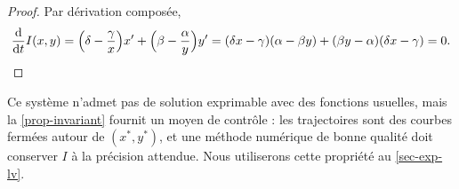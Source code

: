 
\begin{proof}
Par dérivation composée,
\[
  \frac{\mathrm{d}}{\mathrm{d} t}I(x,y)=\Bigl(\delta-\frac{\gamma}{x}\Bigr)x'+\Bigl(\beta-\frac{\alpha}{y}\Bigr)y'
  =(\delta x-\gamma)(\alpha-\beta y)+(\beta y-\alpha)(\delta x-\gamma)=0 .\qedhere
\]
\end{proof}

\begin{remarque}
Ce système n'admet pas de solution exprimable avec des fonctions usuelles, mais la \cref{prop-invariant} fournit un moyen de contrôle : les trajectoires sont des courbes fermées autour de $(x^\ast,y^\ast)$, et une méthode numérique de bonne qualité doit conserver $I$ à la précision attendue. Nous utiliserons cette propriété au \cref{sec-exp-lv}.
\end{remarque}

